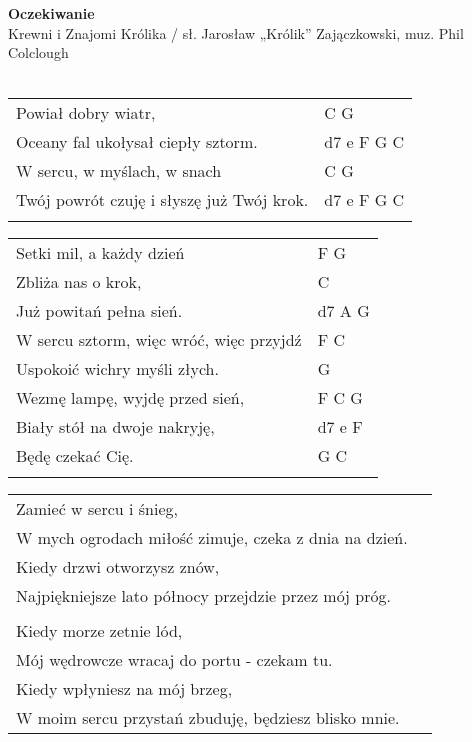 \documentclass[a5paper]{article}
\begin{document}


\noindent
\fontsize{12pt}{15pt}\selectfont
\textbf{Oczekiwanie} \\
\fontsize{8pt}{10pt}\selectfont
Krewni i Znajomi Królika / sł. Jarosław „Królik” Zajączkowski, muz. Phil Colclough\\ \\
\fontsize{10pt}{12pt}\selectfont
{}
\begin{tabular}{@{}p{8.50cm}p{3cm}@{}}
\noindent
Powiał dobry wiatr, & C G \\
Oceany fal ukołysał ciepły sztorm. & d7 e F G C \\
W sercu, w myślach, w snach & C G \\
Twój powrót czuję i słyszę już Twój krok. & d7 e F G C \\ \\
\end{tabular}

\noindent
\begin{tabular}{@{}p{7.50cm}p{3cm}@{}}
Setki mil, a każdy dzień & F G \\
Zbliża nas o krok, & C \\
Już powitań pełna sień. & d7 A G \\
W sercu sztorm, więc wróć, więc przyjdź & F C \\
Uspokoić wichry myśli złych. & G \\
Wezmę lampę, wyjdę przed sień, & F C G \\
Biały stół na dwoje nakryję, & d7 e F \\
Będę czekać Cię. & G C \\ \\
\end{tabular}

\noindent
\begin{tabular}{@{}p{8.50cm}p{3cm}@{}}
Zamieć w sercu i śnieg,\\
W mych ogrodach miłość zimuje, czeka z dnia na dzień.\\
Kiedy drzwi otworzysz znów,\\
Najpiękniejsze lato północy przejdzie przez mój próg.\\ \\

Kiedy morze zetnie lód,\\
Mój wędrowcze wracaj do portu - czekam tu.\\
Kiedy wpłyniesz na mój brzeg,\\
W moim sercu przystań zbuduję, będziesz blisko mnie.
\end{tabular}
\end{document}
